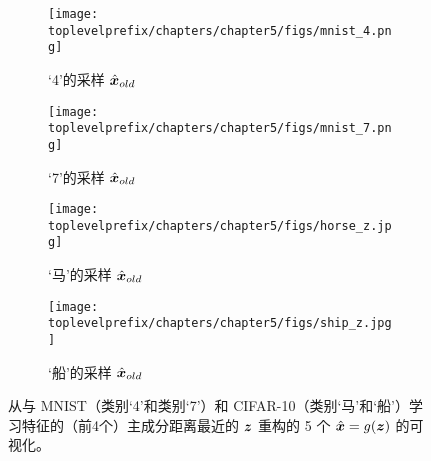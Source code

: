 \documentclass[../../book-main.tex]{subfiles}
\begin{document}
\begin{figure}[t]
    \begin{subfigure}[t]{0.20\textwidth}
        \centering
        \texttt{[image: \\toplevelprefix/chapters/chapter5/figs/mnist\_4.png]}
        \caption{‘4’的采样 $\hat{\bm{x}}_{old}$}
    \end{subfigure}
    \hfill
    \begin{subfigure}[t]{0.20\textwidth}
        \centering
        \texttt{[image: \\toplevelprefix/chapters/chapter5/figs/mnist\_7.png]}
        \caption{‘7’的采样 $\hat{\bm{x}}_{old}$}
    \end{subfigure}
    \hfill
    \begin{subfigure}[t]{0.20\textwidth}
        \centering
        \texttt{[image: \\toplevelprefix/chapters/chapter5/figs/horse\_z.jpg]}
        \caption{‘马’的采样 $\hat{\bm{x}}_{old}$}
    \end{subfigure}
    \hfill
    \begin{subfigure}[t]{0.20\textwidth}
        \centering
        \texttt{[image: \\toplevelprefix/chapters/chapter5/figs/ship\_z.jpg]}
        \caption{‘船’的采样 $\hat{\bm{x}}_{old}$}
    \end{subfigure}
    \caption{\small 从与 {MNIST}（类别‘4’和类别‘7’）和 {CIFAR-10}（类别‘马’和‘船’）学习特征的（前4个）主成分距离最近的 $\bm{z}$ 重构的 5 个 $\hat {\bm{x}}=g(\bm{z})$ 的可视化。}
    \label{fig:pca_sampling_main}
\end{figure}

\end{document}
